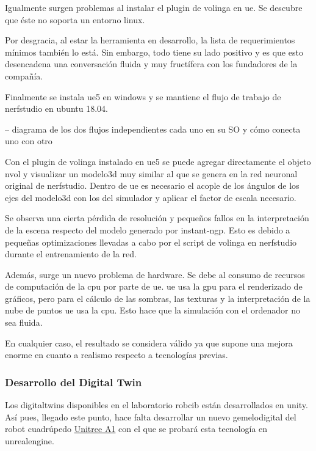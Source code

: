 \documentclass[a4paper, 12pt, spanish, twoside]{article}
\begin{document}
Igualmente surgen problemas al instalar el \gls{plugin} de \gls{volinga} en \acrshort{ue}. Se descubre que éste no soporta un entorno \gls{linux}. 

Por desgracia, al estar la herramienta en desarrollo, la lista de requerimientos mínimos también lo está. Sin embargo, todo tiene su lado positivo y es que esto desencadena una conversación fluida y muy fructífera con los fundadores de la compañía. 

Finalmente se instala \acrshort{ue}5 en \gls{windows} y se mantiene el flujo de trabajo de \gls{nerfstudio} en \gls{ubuntu} 18.04. 

-- diagrama de los dos flujos independientes cada uno en su SO y cómo conecta uno con otro 

Con el \gls{plugin} de \gls{volinga} instalado en \acrshort{ue}5 se puede agregar directamente el objeto \gls{nvol} y visualizar un \gls{modelo3d} muy similar al que se genera en la red neuronal original de \gls{nerfstudio}. Dentro de \acrshort{ue} es necesario el acople de los ángulos de los ejes del \gls{modelo3d} con los del simulador y aplicar el factor de escala necesario.  

Se observa una cierta pérdida de resolución y pequeños fallos en la interpretación de la escena respecto del modelo generado por \gls{instant-ngp}. Esto es debido a pequeñas optimizaciones llevadas a cabo por el script de \gls{volinga} en \gls{nerfstudio} durante el entrenamiento de la red.  

Además, surge un nuevo problema de \gls{hardware}. Se debe al consumo de recursos de computación de la \acrshort{cpu} por parte de \acrshort{ue}. \acrshort{ue} usa la \acrshort{gpu} para el renderizado de gráficos, pero para el cálculo de las sombras, las texturas y la interpretación de la nube de puntos \acrshort{ue} usa la \acrshort{cpu}. Esto hace que la simulación con el ordenador no sea fluida. 

En cualquier caso, el resultado se considera válido ya que supone una mejora enorme en cuanto a realismo respecto a tecnologías previas. 

\subsubsection{Desarrollo del Digital Twin} \label{sec:implementacion:nerfstudio-volinga:desarrollo}

Los \glspl{digitaltwin} disponibles en el laboratorio \acrshort{robcib} están desarrollados en \gls{unity}. Así pues, llegado este punto, hace falta desarrollar un nuevo \gls{gemelodigital} del robot cuadrúpedo \href{https://www.unitree.com/a1/}{Unitree A1} con el que se probará esta tecnología en \gls{unrealengine}. 
\end{document}
